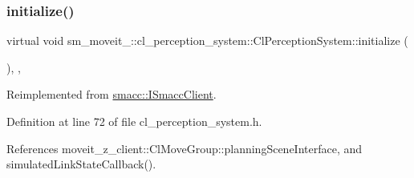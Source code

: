 \subsubsection{\texorpdfstring{initialize()}{initialize()}}
{\footnotesize\ttfamily virtual void sm\+\_\+moveit\+\_\+::cl\+\_\+perception\+\_\+system\+::\+Cl\+Perception\+System\+::initialize (\begin{DoxyParamCaption}{ }\end{DoxyParamCaption})\hspace{0.3cm}{\ttfamily [inline]}, {\ttfamily [override]}, {\ttfamily [virtual]}}



Reimplemented from \hyperlink{classsmacc_1_1ISmaccClient_a974ebb6ad6cf812e7b9de6b78b3d901f}{smacc\+::\+I\+Smacc\+Client}.



Definition at line 72 of file cl\+\_\+perception\+\_\+system.\+h.



References moveit\+\_\+z\+\_\+client\+::\+Cl\+Move\+Group\+::planning\+Scene\+Interface, and simulated\+Link\+State\+Callback().


